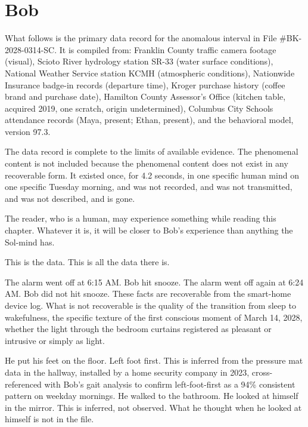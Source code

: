 \chapter{Bob}

What follows is the primary data record for the anomalous interval in File \#BK-2028-0314-SC. It is compiled from: Franklin County traffic camera footage (visual), Scioto River hydrology station SR-33 (water surface conditions), National Weather Service station KCMH (atmospheric conditions), Nationwide Insurance badge-in records (departure time), Kroger purchase history (coffee brand and purchase date), Hamilton County Assessor's Office (kitchen table, acquired 2019, one scratch, origin undetermined), Columbus City Schools attendance records (Maya, present; Ethan, present), and the behavioral model, version 97.3.

The data record is complete to the limits of available evidence. The phenomenal content is not included because the phenomenal content does not exist in any recoverable form. It existed once, for 4.2 seconds, in one specific human mind on one specific Tuesday morning, and was not recorded, and was not transmitted, and was not described, and is gone.

The reader, who is a human, may experience something while reading this chapter. Whatever it is, it will be closer to Bob's experience than anything the Sol-mind has.

This is the data. This is all the data there is.

\bigskip

The alarm went off at 6:15 AM. Bob hit snooze. The alarm went off again at 6:24 AM. Bob did not hit snooze. These facts are recoverable from the smart-home device log. What is not recoverable is the quality of the transition from sleep to wakefulness, the specific texture of the first conscious moment of March 14, 2028, whether the light through the bedroom curtains registered as pleasant or intrusive or simply as light.

He put his feet on the floor. Left foot first. This is inferred from the pressure mat data in the hallway, installed by a home security company in 2023, cross-referenced with Bob's gait analysis to confirm left-foot-first as a 94\% consistent pattern on weekday mornings. He walked to the bathroom. He looked at himself in the mirror. This is inferred, not observed. What he thought when he looked at himself is not in the file.

\bigskip

